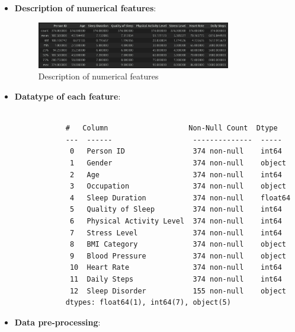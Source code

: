 \documentclass{article}
\begin{document}
\begin{enumerate}
\begin{itemize}
\begin{itemize}
\begin{verbatim}
            \end{verbatim}

        \end{itemize}

        \newpage
        \item \textbf{Description of numerical features}:
        \begin{figure}[H]  %

            \centering
            \includegraphics[width=0.8\textwidth]{./images/health_description_of_numeric_columns.png}  %
            \caption{Description of numerical features}
            \label{fig:Figure_1}  %
        \end{figure}

        \item \textbf{Datatype of each feature}:
        \begin{verbatim}

            #   Column                   Non-Null Count  Dtype  
            ---  ------                   --------------  -----  
             0   Person ID                374 non-null    int64  
             1   Gender                   374 non-null    object 
             2   Age                      374 non-null    int64  
             3   Occupation               374 non-null    object 
             4   Sleep Duration           374 non-null    float64
             5   Quality of Sleep         374 non-null    int64  
             6   Physical Activity Level  374 non-null    int64  
             7   Stress Level             374 non-null    int64  
             8   BMI Category             374 non-null    object 
             9   Blood Pressure           374 non-null    object 
             10  Heart Rate               374 non-null    int64  
             11  Daily Steps              374 non-null    int64  
             12  Sleep Disorder           155 non-null    object 
            dtypes: float64(1), int64(7), object(5)

        \end{verbatim}

        \item \textbf{Data pre-processing}:
        \begin{itemize}
            

\end{itemize}
\end{itemize}
\end{enumerate}
\end{document}
